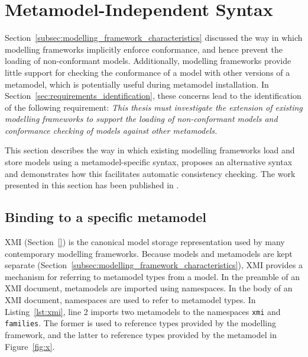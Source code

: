 
\section{Metamodel-Independent Syntax}
\label{sec:mmi_syntax}
Section~\ref{subsec:modelling_framework_characteristics} discussed the way in which modelling frameworks implicitly enforce conformance, and hence prevent the loading of non-conformant models. Additionally, modelling frameworks provide little support for checking the conformance of a model with other versions of a metamodel, which is potentially useful during metamodel installation. In Section~\ref{sec:requirements_identification}, these concerns lead to the identification of the following requirement: \emph{This thesis must investigate the extension of existing modelling frameworks to support the loading of non-conformant models and conformance checking of models against other metamodels.}

This section describes the way in which existing modelling frameworks load and store models using a metamodel-specific syntax, proposes an alternative syntax and demonstrates how this facilitates automatic consistency checking. The work presented in this section has been published in \cite{rose09enhanced}.



\subsection{Binding to a specific metamodel}
\label{subsec:binding_specific}
XMI (Section~\ref{}) is the canonical model storage representation used by many contemporary modelling frameworks. Because models and metamodels are kept separate (Section~\ref{subsec:modelling_framework_characteristics}), XMI provides a mechanism for referring to metamodel types from a model. In the preamble of an XMI document, metamodels are imported using namespaces. In the body of an XMI document, namespaces are used to refer to metamodel types. In Listing~\ref{lst:xmi}, line 2 imports two metamodels to the namespaces \texttt{xmi} and \texttt{families}. The former is used to reference types provided by the modelling framework, and the latter to reference types provided by the metamodel in Figure~\ref{fig:x}.

